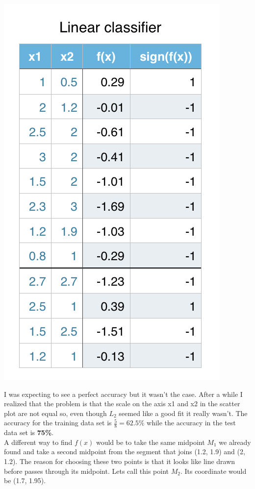 \documentclass[11pt]{article}
\begin{document}
\begin{center}
\includegraphics[scale=0.75]{linear.png}
\end{center}

I was expecting to see a perfect accuracy but it wasn't the case. After a while I realized that the problem is that the scale on the axis x1 and x2 in the scatter plot are not equal so, even though $L_2$ seemed like a good fit it really wasn't. The accuracy for the training data set is $\frac{5}{8} = 62.5\%$ while the accuracy in the test data set is \textbf{75\%}.\\

A different way to find $f(x)$ would be to take the same midpoint $M_1$ we already found and take a second midpoint from the segment that joins (1.2, 1.9) and (2, 1.2). The reason for choosing these two points is that it looks like line drawn before passes through its midpoint. Lets call this point $M_2$. Its coordinate would be (1.7, 1.95). \\
\end{document}
